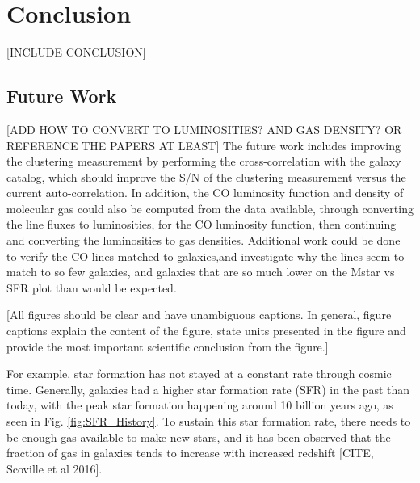 \documentclass[twoside,single]{lion-msc}
\begin{document}




\chapter{Conclusion}

[INCLUDE CONCLUSION]

\section{Future Work}

[ADD HOW TO CONVERT TO LUMINOSITIES? AND GAS DENSITY? OR REFERENCE THE PAPERS AT LEAST]
The future work includes improving the clustering measurement by performing the cross-correlation with the galaxy catalog, which should improve the S/N of the clustering measurement versus the current auto-correlation. In addition, the CO luminosity function and density of molecular gas could also be computed from the data available, through converting the line fluxes to luminosities, for the CO luminosity function, then continuing and converting the luminosities to gas densities. Additional work could be done to verify the CO lines matched to galaxies,and investigate why the lines seem to match to so few galaxies, and galaxies that are so much lower on the Mstar vs SFR plot than would be expected. 

[All figures should be clear and have unambiguous captions. In general, figure captions explain the content of the figure, state units presented in the figure and provide the most important scientific conclusion from the figure.]

\appendix


For example, star formation has not stayed at a constant rate through cosmic time. Generally, galaxies had a higher star formation rate (SFR) in the past than today, with the peak star formation happening around 10 billion years ago, as seen in Fig. \ref{fig:SFR_History}. To sustain this star formation rate, there needs to be enough gas available to make new stars, and it has been observed that the fraction of gas in galaxies tends to increase with increased redshift [CITE, Scoville et al 2016]. 
\end{document}
